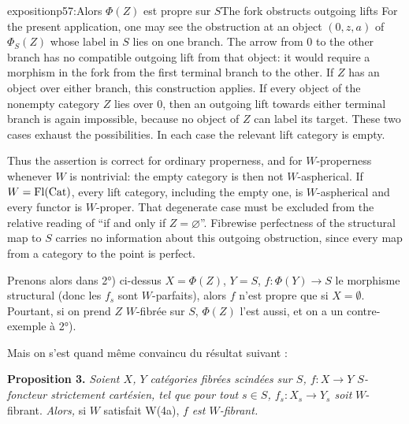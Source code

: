 \begin{itemize}[leftmargin=5em,labelsep=0.5em]
\begin{dcomment}{exposition}{p57:Alors $\Phi(Z)$ est propre sur $S$}{The fork obstructs outgoing lifts}
For the present application, one may see the obstruction at an object $(0,z,a)$ of $\Phi_S(Z)$ whose label in $S$ lies on one branch. The arrow from $0$ to the other branch has no compatible outgoing lift from that object: it would require a morphism in the fork from the first terminal branch to the other. If $Z$ has an object over either branch, this construction applies. If every object of the nonempty category $Z$ lies over $0$, then an outgoing lift towards either terminal branch is again impossible, because no object of $Z$ can label its target. These two cases exhaust the possibilities. In each case the relevant lift category is empty.

Thus the assertion is correct for ordinary properness, and for $W$-properness whenever $W$ is nontrivial: the empty category is then not $W$-aspherical. If $W=\operatorname{Fl}(\mathrm{Cat})$, every lift category, including the empty one, is $W$-aspherical and every functor is $W$-proper. That degenerate case must be excluded from the relative reading of ``if and only if $Z=\varnothing$''. Fibrewise perfectness of the structural map to $S$ carries no information about this outgoing obstruction, since every map from a category to the point is perfect.
\end{dcomment}


Prenons alors dans 2°) ci-dessus $X = \Phi(Z)$, $Y = S$, $f : \Phi(Y) \longrightarrow S$ le morphisme structural (donc les $f_s$ sont $W$-parfaits), alors $f$ n'est propre que si $X = \emptyset$. Pourtant, si on prend $Z$ $W$-fibrée sur $S$, $\Phi(Z)$ l'est aussi, et on a un contre-exemple à 2°).
\end{itemize}

Mais on s'est quand même convaincu du résultat suivant :

\textbf{Proposition 3.} \textit{Soient $X$, $Y$ catégories fibrées scindées sur $S$, $f : X \longrightarrow Y$ $S$-foncteur strictement cartésien, tel que}
\textit{pour tout $s \in S$, $f_s : X_s \longrightarrow Y_s$ soit} $W$-fibrant. \textit{Alors,} si $W$ satisfait W(4a), $f$ \textit{est $W$-fibrant.}

